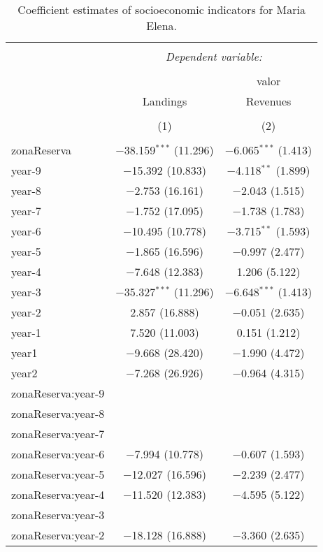\documentclass[utf8]{frontiers_suppmat} %
\theoremstyle{definition}
\theoremstyle{definition}
\theoremstyle{definition}
\theoremstyle{remark}
\begin{document}
\begin{table}[!htbp] \centering 
  \caption{Coefficient estimates of socioeconomic indicators for Maria Elena.} 
  \label{} 
\tiny 
\begin{tabular}{@{\extracolsep{1pt}}lcc} 
\\[-1.8ex]\hline 
\hline \\[-1.8ex] 
 & \multicolumn{2}{c}{\textit{Dependent variable:}} \\ 
\cline{2-3} 
\\[-1.8ex] &  & valor \\ 
 & Landings & Revenues \\ 
\\[-1.8ex] & (1) & (2)\\ 
\hline \\[-1.8ex] 
 zonaReserva & $-$38.159$^{***}$ (11.296) & $-$6.065$^{***}$ (1.413) \\ 
  year-9 & $-$15.392 (10.833) & $-$4.118$^{**}$ (1.899) \\ 
  year-8 & $-$2.753 (16.161) & $-$2.043 (1.515) \\ 
  year-7 & $-$1.752 (17.095) & $-$1.738 (1.783) \\ 
  year-6 & $-$10.495 (10.778) & $-$3.715$^{**}$ (1.593) \\ 
  year-5 & $-$1.865 (16.596) & $-$0.997 (2.477) \\ 
  year-4 & $-$7.648 (12.383) & 1.206 (5.122) \\ 
  year-3 & $-$35.327$^{***}$ (11.296) & $-$6.648$^{***}$ (1.413) \\ 
  year-2 & 2.857 (16.888) & $-$0.051 (2.635) \\ 
  year-1 & 7.520 (11.003) & 0.151 (1.212) \\ 
  year1 & $-$9.668 (28.420) & $-$1.990 (4.472) \\ 
  year2 & $-$7.268 (26.926) & $-$0.964 (4.315) \\ 
  zonaReserva:year-9 &  &  \\ 
  zonaReserva:year-8 &  &  \\ 
  zonaReserva:year-7 &  &  \\ 
  zonaReserva:year-6 & $-$7.994 (10.778) & $-$0.607 (1.593) \\ 
  zonaReserva:year-5 & $-$12.027 (16.596) & $-$2.239 (2.477) \\ 
  zonaReserva:year-4 & $-$11.520 (12.383) & $-$4.595 (5.122) \\ 
  zonaReserva:year-3 &  &  \\ 
  zonaReserva:year-2 & $-$18.128 (16.888) & $-$3.360 (2.635) \\ 

\end{tabular}
\end{table}
\end{document}
